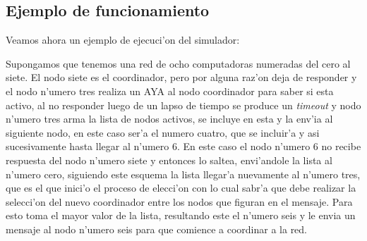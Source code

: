 \newpage
\subsection{Ejemplo de funcionamiento}
Veamos ahora un ejemplo de ejecuci'on del simulador:

Supongamos que tenemos una red de ocho computadoras numeradas del cero al
siete. El nodo siete es el coordinador, pero por alguna raz'on deja de
responder y el nodo n'umero tres realiza un AYA al nodo coordinador para saber
si esta activo, al no responder luego de un lapso de tiempo se produce un
\emph{timeout} y  nodo n'umero tres arma la lista de nodos activos, se incluye
en esta y la env'ia al siguiente nodo, en este caso ser'a el numero cuatro, que
se incluir'a y asi sucesivamente hasta llegar al n'umero 6. En este caso el
nodo n'umero 6 no recibe respuesta del nodo n'umero siete y entonces lo saltea,
envi'andole la lista al n'umero cero, siguiendo este esquema la lista llegar'a
nuevamente al n'umero tres, que es el que inici'o el proceso de elecci'on con
lo cual sabr'a que debe realizar la selecci'on del nuevo coordinador entre los
nodos que figuran en el mensaje. Para esto toma el mayor valor de la lista,
resultando este el n'umero seis y le envia un mensaje al nodo n'umero seis para
que comience a coordinar a la red.



